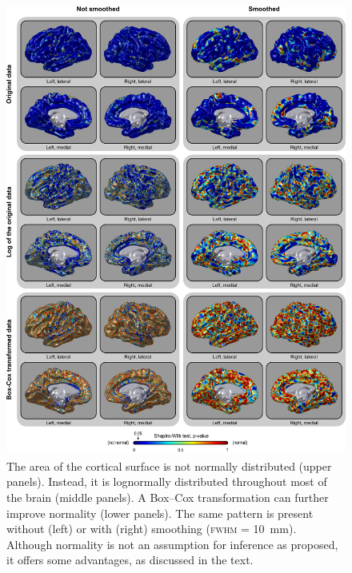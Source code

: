 
\begin{figure}[!p]  %
\centering
\includegraphics[width=14cm]{images/shapiro.png}
\caption[The distribution of surface area is lognormal.]{The area of the cortical surface is not normally distributed (upper panels). Instead, it is lognormally distributed throughout most of the brain (middle panels). A Box--Cox transformation can further improve normality (lower panels). The same pattern is present without (left) or with (right) smoothing (\textsc{fwhm} = 10~mm). Although normality is not an assumption for inference as proposed, it offers some advantages, as discussed in the text.}
\label{fig:shapiro}
\end{figure}

